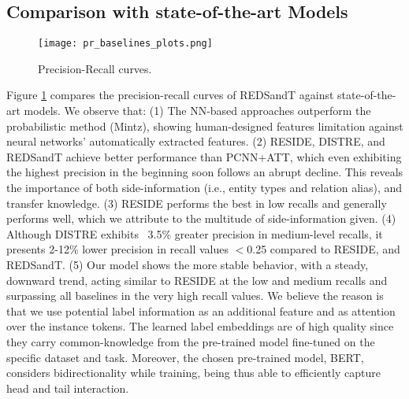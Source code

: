 \documentclass[11pt,a4paper]{article}
\begin{document}
\subsection{Comparison with state-of-the-art Models}
\begin{figure}[H]
    \vspace{-2mm}
    \centering
    \texttt{[image: pr\_baselines\_plots.png]}
    \setlength{\abovecaptionskip}{-5pt}
    \caption{Precision-Recall curves.}
    \label{fig:pr_curves}
    \vspace{-5mm}
\end{figure}
Figure \ref{fig:pr_curves} compares the precision-recall curves of REDSandT against state-of-the-art models. We observe that:
(1) The NN-based approaches outperform the probabilistic method (Mintz), showing human-designed features limitation against neural networks' automatically extracted features. (2) RESIDE, DISTRE, and REDSandT achieve better performance than PCNN+ATT, which even exhibiting the highest precision in the beginning soon follows an abrupt decline. This reveals the importance of both side-information (i.e., entity types and relation alias), and transfer knowledge. (3) RESIDE performs the best in low recalls and generally performs well, which we attribute to the multitude of side-information given. (4) Although DISTRE exhibits ~3.5\% greater precision in medium-level recalls, it presents 2-12\% lower precision in recall values $<$0.25 compared to RESIDE, and REDSandT. (5) Our model shows the more stable behavior, with a steady, downward trend, acting similar to RESIDE at the low and medium recalls and surpassing all baselines in the very high recall values. We believe the reason is that we use potential label information as an additional feature and as attention over the instance tokens. The learned label embeddings are of high quality since they carry common-knowledge from the pre-trained model fine-tuned on the specific dataset and task. Moreover, the chosen pre-trained model, BERT, considers bidirectionality while training, being thus able to efficiently capture head and tail interaction.
\end{document}
